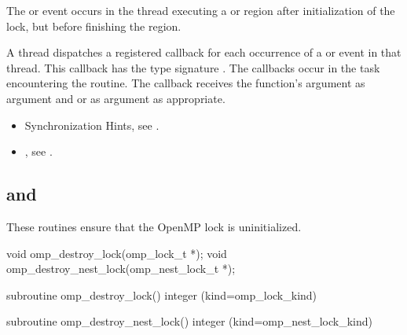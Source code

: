 \events

The  or  event occurs in the thread
executing a  or  region
after initialization of the lock, but before finishing the region.

\tools

A thread dispatches a registered 
callback for each occurrence of a  or  event
in that thread.  This callback has the type signature .
The callbacks occur in the task encountering the routine.
The callback receives the function's  argument as
 argument and
 or
  as  argument as appropriate.

\crossreferences
\begin{itemize}
\item Synchronization Hints, see .
\item {}, see
.
\end{itemize}



\subsection[\hcode{omp_destroy_lock} and \hcode{omp_destroy_nest_lock}]{ and\\ }
\label{subsec:omp_destroy_lock and omp_destroy_nest_lock}
\summary
These routines ensure that the OpenMP lock is uninitialized.

\format
\begin{ccppspecific}
\begin{ompcFunction}
void omp_destroy_lock(omp_lock_t *);
void omp_destroy_nest_lock(omp_nest_lock_t *);
\end{ompcFunction}
\end{ccppspecific}

\begin{fortranspecific}
\begin{ompfSubroutine}
subroutine omp_destroy_lock()
integer (kind=omp_lock_kind) 

subroutine omp_destroy_nest_lock()
integer (kind=omp_nest_lock_kind) 
\end{ompfSubroutine}
\end{fortranspecific}

